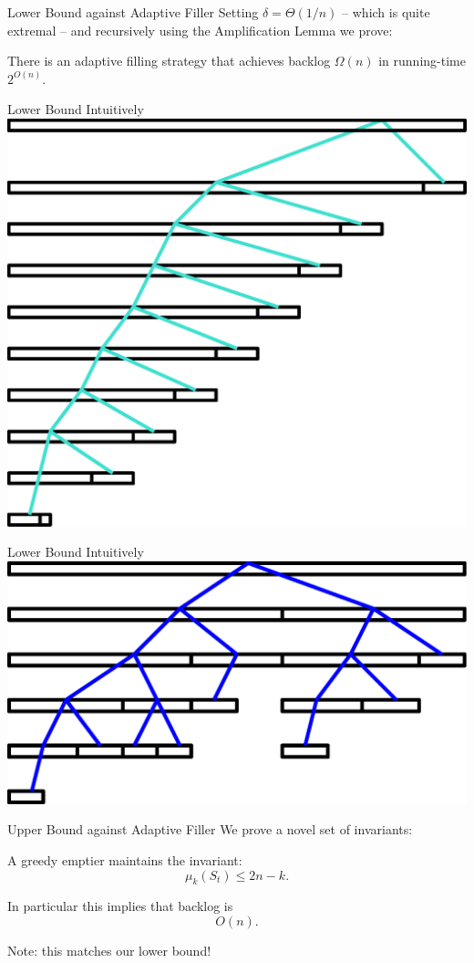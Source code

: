 \documentclass[xcolor=x11names, svgnames, rgb]{beamer}
\begin{document}
\begin{frame}[t]{Lower Bound against Adaptive Filler}
  Setting $\delta = \Theta(1/n)$ -- which is quite extremal -- and recursively using
  the Amplification Lemma we prove:
  \begin{theorem}
    There is an adaptive filling strategy that achieves backlog $\Omega(n)$ in running-time $2^{O(n)}$.
  \end{theorem}
\end{frame}

\begin{frame}[t]{Lower Bound Intuitively}
  \vspace{0.5cm}
  \includegraphics[width=0.7\linewidth]{amplificationImgs/expo_cor.eps}
\end{frame}

\begin{frame}[t]{Lower Bound Intuitively}
  \vspace{0.5cm}
  \includegraphics[width=0.7\linewidth]{amplificationImgs/quasipoly_cor.eps}
\end{frame}

\begin{frame}[t]{Upper Bound against Adaptive Filler}
  We prove a novel set of invariants:

  \begin{theorem}
    A greedy emptier maintains the invariant:
    $$\mu_k(S_t) \le 2n-k.$$
  \end{theorem}

  \vspace{0.3cm}
  In particular this implies that backlog is $$O(n).$$

  \vspace{0.3cm}
  Note: this matches our lower bound!
\end{frame}
\end{document}

